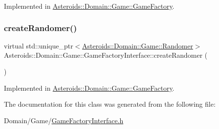 Implemented in \hyperlink{classAsteroids_1_1Domain_1_1Game_1_1GameFactory_a1433b01f9a0f1ed45920fd9fb86f50da}{Asteroids\+::\+Domain\+::\+Game\+::\+Game\+Factory}.

\mbox{\label{classAsteroids_1_1Domain_1_1Game_1_1GameFactoryInterface_a787a72445e1bc61ef5911b7bbbf18929}} 
\subsubsection{\texorpdfstring{create\+Randomer()}{createRandomer()}}
{\footnotesize\ttfamily virtual std\+::unique\+\_\+ptr$<$\hyperlink{classAsteroids_1_1Domain_1_1Game_1_1Randomer}{Asteroids\+::\+Domain\+::\+Game\+::\+Randomer}$>$ Asteroids\+::\+Domain\+::\+Game\+::\+Game\+Factory\+Interface\+::create\+Randomer (\begin{DoxyParamCaption}{ }\end{DoxyParamCaption})\hspace{0.3cm}{\ttfamily [pure virtual]}}



Implemented in \hyperlink{classAsteroids_1_1Domain_1_1Game_1_1GameFactory_ab46d642aa48fd4de15a0de8d7a425f1d}{Asteroids\+::\+Domain\+::\+Game\+::\+Game\+Factory}.



The documentation for this class was generated from the following file\+:\begin{DoxyCompactItemize}
\item 
Domain/\+Game/\hyperlink{GameFactoryInterface_8h}{Game\+Factory\+Interface.\+h}\end{DoxyCompactItemize}
